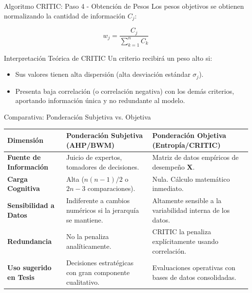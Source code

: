 \documentclass[aspectratio=169, 10pt]{beamer}
\begin{document}
\begin{frame}{Algoritmo CRITIC: Paso 4 - Obtención de Pesos}
    Los pesos objetivos se obtienen normalizando la cantidad de información $C_j$:
    
    \[ w_j = \frac{C_j}{\sum_{k=1}^{n} C_k} \]
    
    \begin{exampleblock}{Interpretación Teórica de CRITIC}
        \scriptsize
        Un criterio recibirá un peso alto si:
        \begin{itemize}
            \item Sus valores tienen alta dispersión (alta desviación estándar $\sigma_j$).
            \item Presenta baja correlación (o correlación negativa) con los demás criterios, aportando información única y no redundante al modelo.
        \end{itemize}
    \end{exampleblock}
\end{frame}

\begin{frame}{Comparativa: Ponderación Subjetiva vs. Objetiva}
    \begin{center}
        \scriptsize
        \begin{tabular}{p{3.2cm}p{5cm}p{5cm}}
            \toprule
            \textbf{Dimensión} & \textbf{Ponderación Subjetiva (AHP/BWM)} & \textbf{Ponderación Objetiva (Entropía/CRITIC)} \\
            \midrule
            \textbf{Fuente de Información} & Juicio de expertos, tomadores de decisiones. & Matriz de datos empíricos de desempeño $\mathbf{X}$. \\
            \textbf{Carga Cognitiva} & Alta ($n(n-1)/2$ o $2n-3$ comparaciones). & Nula. Cálculo matemático inmediato. \\
            \textbf{Sensibilidad a Datos} & Indiferente a cambios numéricos si la jerarquía se mantiene. & Altamente sensible a la variabilidad interna de los datos. \\
            \textbf{Redundancia} & No la penaliza analíticamente. & CRITIC la penaliza explícitamente usando correlación. \\
            \textbf{Uso sugerido en Tesis} & Decisiones estratégicas con gran componente cualitativo. & Evaluaciones operativas con bases de datos consolidadas. \\
            \bottomrule
        \end{tabular}
    \end{center}
\end{frame}
\end{document}
